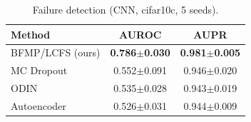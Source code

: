\begin{table}[ht]
\centering
\caption{Failure detection (CNN, cifar10c, 5 seeds).}
\label{tab:main}
\begin{tabular}{lcc}
\toprule
Method & AUROC & AUPR \\
\midrule
BFMP/LCFS (ours) & \textbf{0.786$\pm$0.030} & \textbf{0.981$\pm$0.005} \\
MC Dropout & 0.552$\pm$0.091 & 0.946$\pm$0.020 \\
ODIN & 0.535$\pm$0.028 & 0.943$\pm$0.019 \\
Autoencoder & 0.526$\pm$0.031 & 0.944$\pm$0.009 \\
\bottomrule
\end{tabular}
\end{table}